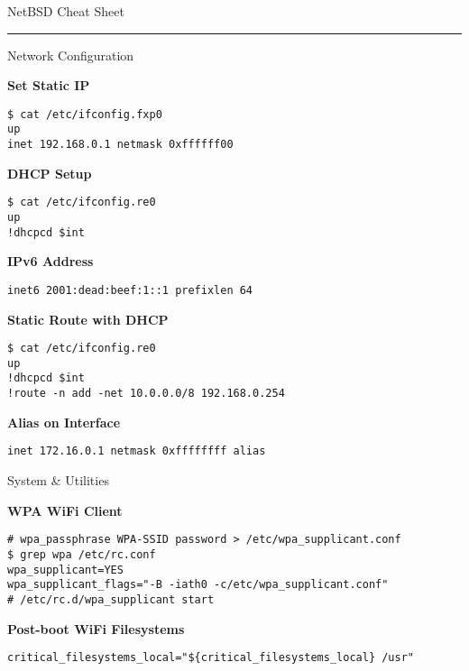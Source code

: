 \documentclass[10pt]{article}
\begin{document}
\pagestyle{empty}

{\titlefont\large \color{neonorangeheader}NetBSD Cheat Sheet}\\
\rule{\linewidth}{0.5pt}
\vspace{0.5em}

\setlength{\columnsep}{20pt}
\begin{multicols}{2}

{\titlefont\color{blueheader}\faNetworkWired\quad Network Configuration}\vspace{5pt}

\textbf{\color{blueheader}Set Static IP}
\begin{lstlisting}
$ cat /etc/ifconfig.fxp0  
up  
inet 192.168.0.1 netmask 0xffffff00
\end{lstlisting}

\textbf{\color{blueheader}DHCP Setup}
\begin{lstlisting}
$ cat /etc/ifconfig.re0  
up  
!dhcpcd $int
\end{lstlisting}

\textbf{\color{blueheader}IPv6 Address}
\begin{lstlisting}
inet6 2001:dead:beef:1::1 prefixlen 64
\end{lstlisting}

\textbf{\color{blueheader}Static Route with DHCP}
\begin{lstlisting}
$ cat /etc/ifconfig.re0  
up  
!dhcpcd $int
!route -n add -net 10.0.0.0/8 192.168.0.254
\end{lstlisting}

\textbf{\color{blueheader}Alias on Interface}
\begin{lstlisting}
inet 172.16.0.1 netmask 0xffffffff alias
\end{lstlisting}

\vfill\null\columnbreak

{\titlefont\color{blueheader}\faTools\quad System & Utilities}\vspace{5pt}

\textbf{\color{blueheader}WPA WiFi Client}
\begin{lstlisting}
# wpa_passphrase WPA-SSID password > /etc/wpa_supplicant.conf
$ grep wpa /etc/rc.conf
wpa_supplicant=YES
wpa_supplicant_flags="-B -iath0 -c/etc/wpa_supplicant.conf"
# /etc/rc.d/wpa_supplicant start
\end{lstlisting}

\textbf{\color{blueheader}Post-boot WiFi Filesystems}
\begin{lstlisting}
critical_filesystems_local="${critical_filesystems_local} /usr"
\end{lstlisting}


\end{multicols}
\end{document}
